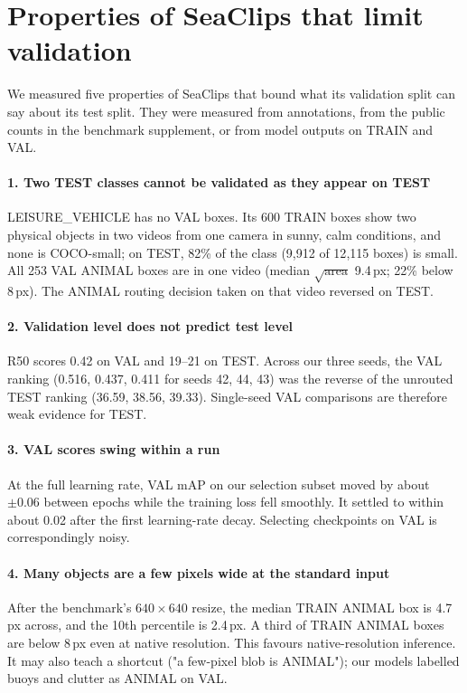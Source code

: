\section{Properties of SeaClips that limit validation}\label{sec:dataset}

We measured five properties of SeaClips that bound what its validation split can say about its test split. They were measured from annotations, from the public counts in the benchmark supplement, or from model outputs on TRAIN and VAL.

\paragraph{1. Two TEST classes cannot be validated as they appear on TEST}
LEISURE\_VEHICLE has no VAL boxes. Its 600 TRAIN boxes show two physical objects in two videos from one camera in sunny, calm conditions, and none is COCO-small; on TEST, 82\% of the class (9{,}912 of 12{,}115 boxes) is small. All 253 VAL ANIMAL boxes are in one video (median $\sqrt{\text{area}}$ 9.4\,px; 22\% below 8\,px). The ANIMAL routing decision taken on that video reversed on TEST.

\paragraph{2. Validation level does not predict test level}
R50 scores 0.42 on VAL and 19--21 on TEST. Across our three seeds, the VAL ranking (0.516, 0.437, 0.411 for seeds 42, 44, 43) was the reverse of the unrouted TEST ranking (36.59, 38.56, 39.33). Single-seed VAL comparisons are therefore weak evidence for TEST.

\paragraph{3. VAL scores swing within a run}
At the full learning rate, VAL mAP on our selection subset moved by about $\pm 0.06$ between epochs while the training loss fell smoothly. It settled to within about 0.02 after the first learning-rate decay. Selecting checkpoints on VAL is correspondingly noisy.

\paragraph{4. Many objects are a few pixels wide at the standard input}
After the benchmark's $640 \times 640$ resize, the median TRAIN ANIMAL box is 4.7\,px across, and the 10th percentile is 2.4\,px. A third of TRAIN ANIMAL boxes are below 8\,px even at native resolution. This favours native-resolution inference. It may also teach a shortcut ("a few-pixel blob is ANIMAL"); our models labelled buoys and clutter as ANIMAL on VAL.

